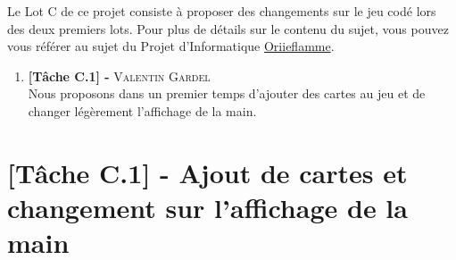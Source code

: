 \documentclass[12pt, openany]{report}
\begin{document}
   	Le Lot C de ce projet consiste à proposer des changements sur le jeu codé lors des deux premiers lots. Pour plus de détails sur le contenu du sujet, vous pouvez vous référer au sujet du Projet d'Informatique \href{https://projet-info.pedago.ensiie.fr}{Oriieflamme}. \\
   	
   	\begin{enumerate}
   		\item \textbf{[Tâche C.1] -} \textsc{Valentin Gardel} \\
   		Nous proposons dans un premier temps d'ajouter des cartes au jeu et de changer légèrement l'affichage de la main.
   	\end{enumerate}
   
	\chapter{[Tâche C.1] - Ajout de cartes et changement sur l'affichage de la main}
	
\end{document}
